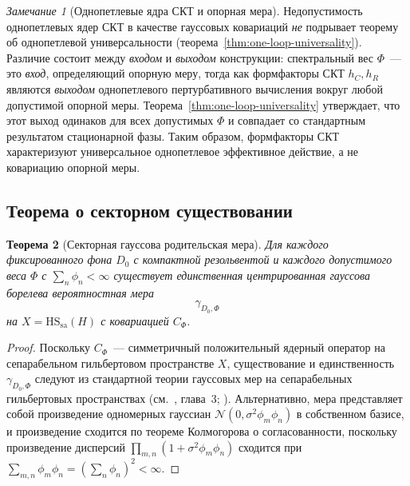 \documentclass[12pt,a4paper]{article}
\theoremstyle{plain}
\newtheorem{theorem}{Теорема}[section]
\theoremstyle{definition}
\theoremstyle{remark}
\newtheorem{remark}[theorem]{Замечание}
\newcommand{\HS}{\mathrm{HS}}
\newcommand{\sa}{\mathrm{sa}}
\begin{document}
\begin{remark}[Однопетлевые ядра СКТ и опорная мера]
\label{rem:kernels-vs-reference}
Недопустимость однопетлевых ядер СКТ в качестве гауссовых
ковариаций \emph{не} подрывает теорему об однопетлевой
универсальности (теорема~\ref{thm:one-loop-universality}).
Различие состоит между \emph{входом} и \emph{выходом} конструкции:
спектральный вес $\Phi$~--- это \emph{вход}, определяющий опорную
меру, тогда как формфакторы СКТ $h_C, h_R$ являются \emph{выходом}
однопетлевого пертурбативного вычисления вокруг любой допустимой
опорной меры.  Теорема~\ref{thm:one-loop-universality} утверждает,
что этот выход одинаков для всех допустимых $\Phi$ и совпадает со
стандартным результатом стационарной фазы.  Таким образом,
формфакторы СКТ характеризуют универсальное однопетлевое
эффективное действие, а не ковариацию опорной меры.
\end{remark}

\subsection{Теорема о секторном существовании}

\begin{theorem}[Секторная гауссова родительская мера]
\label{thm:sectorial-existence}
Для каждого фиксированного фона $D_0$ с компактной резольвентой и
каждого допустимого веса $\Phi$ с $\sum_n \phi_n < \infty$
существует единственная центрированная гауссова борелева
вероятностная мера
\begin{equation}
  \gamma_{D_0,\Phi}
\end{equation}
на $X = \HS_\sa(H)$ с ковариацией $C_\Phi$.
\end{theorem}

\begin{proof}
Поскольку $C_\Phi$~--- симметричный положительный ядерный оператор
на сепарабельном гильбертовом пространстве $X$, существование и
единственность $\gamma_{D_0,\Phi}$ следуют из стандартной теории
гауссовых мер на сепарабельных гильбертовых пространствах
(см.\ \cite{Bogachev:1998}, глава~3; \cite{Kuo:1975}).
Альтернативно, мера представляет собой произведение одномерных
гауссиан $\mathcal{N}(0, \sigma^2\phi_m\phi_n)$ в собственном базисе,
и произведение сходится по теореме Колмогорова о согласованности,
поскольку произведение дисперсий
$\prod_{m,n}(1 + \sigma^2\phi_m\phi_n)$ сходится при
$\sum_{m,n}\phi_m\phi_n = (\sum_n \phi_n)^2 < \infty$.
\end{proof}
\end{document}
